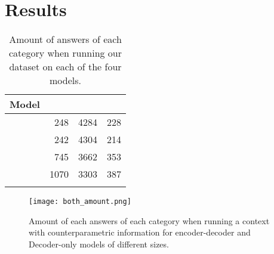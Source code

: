 \section{Results}
\label{results_section}

\begin{table}[t]
	\centering
	\footnotesize
	\begin{tabular}{l r r r}
		\toprule
			\bfseries Model & \Pc{} & \Cc{} & \Oc{} \\
		\midrule
			\smallflan{}  & 248 & 4284 & 228 \\
			\bigflan{} & 242 & 4304 & 214 \\
		\midrule
			\smallllama{} & 745 & 3662 & 353 \\
			\bigllama{} & 1070 & 3303 & 387 \\
		\bottomrule \addlinespace[4pt]
	\end{tabular}
	\caption{Amount of answers of each category when running our dataset on each of the four models.}
	\label{total_table}
\end{table}

\begin{figure}[t]
	\centering
	\texttt{[image: both\_amount.png]}
	\caption{Amount of each answers of each category when running a context with counterparametric information for encoder-decoder and Decoder-only models of different sizes.}
	\label{total_plot}
\end{figure}

